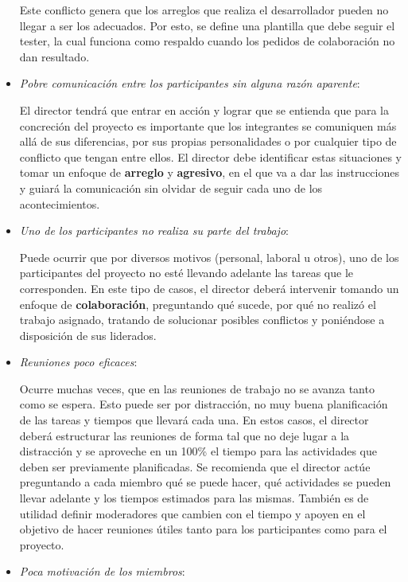 \begin{itemize}
Este conflicto genera que los arreglos que realiza el desarrollador pueden no llegar a ser los adecuados.
Por esto, se define una plantilla que debe seguir el tester, la cual funciona como respaldo cuando los pedidos de colaboración no dan resultado.

\item \textit{Pobre comunicación entre los participantes sin alguna razón aparente}:

El director tendrá que entrar en acción y lograr que se entienda que para la concreción del proyecto es importante que los integrantes se comuniquen más allá de sus diferencias, por sus propias personalidades o por cualquier tipo de conflicto que tengan entre ellos.
El director debe identificar estas situaciones y tomar un enfoque de \textbf{arreglo} y \textbf{agresivo}, en el que va a dar las instrucciones y guiará la comunicación sin olvidar de seguir cada uno de los acontecimientos.

\item \textit{Uno de los participantes no realiza su parte del trabajo}:

Puede ocurrir que por diversos motivos (personal, laboral u otros), uno de los participantes del proyecto no esté llevando adelante las tareas que le corresponden.
En este tipo de casos, el director deberá intervenir tomando un enfoque de \textbf{colaboración}, preguntando qué sucede, por qué no realizó el trabajo asignado, tratando de solucionar posibles conflictos y poniéndose a disposición de sus liderados.

\item \textit{Reuniones poco eficaces}:

Ocurre muchas veces, que en las reuniones de trabajo no se avanza tanto como se espera.
Esto puede ser por distracción, no muy buena planificación de las tareas y tiempos que llevará cada una.
En estos casos, el director deberá estructurar las reuniones de forma tal que no deje lugar a la distracción y se aproveche en un 100\% el tiempo para las actividades que deben ser previamente planificadas.
Se recomienda que el director actúe preguntando a cada miembro qué se puede hacer, qué actividades se pueden llevar adelante y los tiempos estimados para las mismas.
También es de utilidad definir moderadores que cambien con el tiempo y apoyen en el objetivo de hacer reuniones útiles tanto para los participantes como para el proyecto.

\item \textit{Poca motivación de los miembros}:


\end{itemize}

